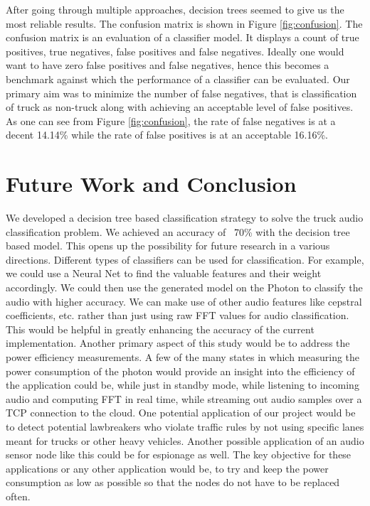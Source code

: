 \documentclass[sigconf, authorversion=false,  screen=true]{acmart}
\begin{document}
	After going through multiple approaches, decision trees seemed to give us the most reliable results. The confusion matrix is shown in Figure \ref{fig:confusion}. The confusion matrix is an evaluation of a classifier model. It displays a count of true positives, true negatives, false positives and false negatives. Ideally one would want to have zero false positives and false negatives, hence this becomes a benchmark against which the performance of a classifier can be evaluated. Our primary aim was to minimize the number of false negatives, that is classification of truck as non-truck along with achieving an acceptable level of false positives. As one can see from Figure \ref{fig:confusion}, the rate of false negatives is at a decent 14.14\% while the rate of false positives is at an acceptable 16.16\%.
	
\section{Future Work and Conclusion}
	We developed a decision tree based classification strategy to solve the truck audio classification problem. We achieved an accuracy of ~70\% with the decision tree based model. This opens up the possibility for future research in a various directions. Different types of classifiers can be used for classification. For example, we could use a Neural Net to find the valuable features and their weight accordingly. We could then use the generated model on the Photon to classify the audio with higher accuracy. We can make use of other audio features like cepstral coefficients, etc. rather than just using raw FFT values for audio classification. This would be helpful in greatly enhancing the accuracy of the current implementation. 
	Another primary aspect of this study would be to address the power efficiency measurements. A few of the many states in which measuring the power consumption of the photon would provide an insight into the efficiency of the application could be, while just in standby mode, while listening to incoming audio and computing FFT in real time, while streaming out audio samples over a TCP connection to the cloud.
	One potential application of our project would be to detect potential lawbreakers who violate traffic rules by not using specific lanes meant for trucks or other heavy vehicles. Another possible application of an audio sensor node like this could be for espionage as well. The key objective for these applications or any other application would be, to try and keep the power consumption as low as possible so that the nodes do not have to be replaced often.
	

 

\balance
\end{document}

